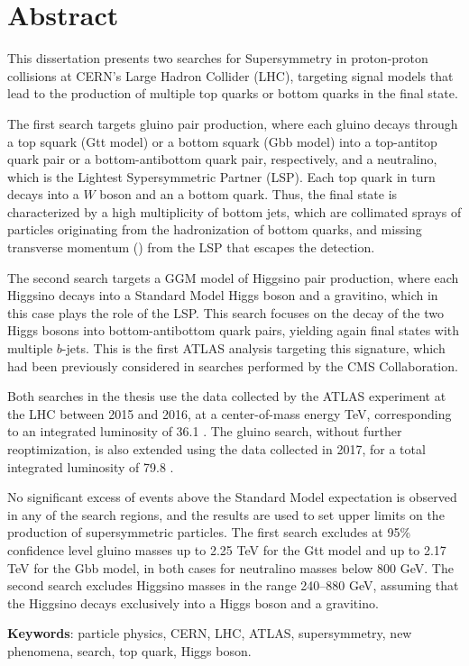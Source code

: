 \chapter*{Abstract}

This dissertation presents two searches for Supersymmetry in proton-proton collisions at CERN's Large Hadron Collider (LHC), 
targeting signal models that lead to the production of multiple top quarks or bottom quarks in the final state.

The first search targets gluino pair production, where each gluino decays through a top squark (Gtt model) or a bottom squark (Gbb model) 
into a top-antitop quark pair or a bottom-antibottom quark pair, respectively, and a neutralino, which is the Lightest Sypersymmetric Partner (LSP).
Each top quark in turn decays into a $W$ boson and an a bottom quark.
Thus, the final state is characterized by a high multiplicity of bottom jets, which are collimated sprays of particles originating from the hadronization of bottom quarks, and 
missing transverse momentum (\met) from the LSP that escapes the detection. 

The second search targets a GGM model of Higgsino pair production, 
where each Higgsino decays into a Standard Model Higgs boson and 
a gravitino, which in this case plays the role of the LSP. 
This search focuses on the decay of the two Higgs bosons into bottom-antibottom quark pairs, yielding again final states with multiple $b$-jets.
This is the first ATLAS analysis targeting this signature, which had been 
previously considered in searches performed by the CMS Collaboration.

Both searches in the thesis use the data collected by the ATLAS experiment at the LHC 
between 2015 and 2016, at a center-of-mass energy  \cmtre TeV,
corresponding to an integrated luminosity of 36.1 \ifb.
The gluino search, without further reoptimization, is also extended using the data collected in 2017, for a total integrated luminosity of 79.8 \ifb.

No significant excess of events above the Standard Model expectation is observed in any of the search regions, 
and the results are used to set upper limits on the production of supersymmetric particles. 
The first search excludes at 95\% confidence level gluino masses up to 2.25 TeV for the Gtt model 
and up to 2.17 TeV for the Gbb model, in both cases for neutralino masses below 800 GeV.
The second search excludes Higgsino masses in the range 240--880 GeV, assuming 
that the Higgsino decays exclusively into a Higgs boson and a gravitino. 

\par\bigskip
\par\bigskip 
\par\bigskip

\noindent \textbf{Keywords}: particle physics, CERN, LHC, ATLAS, supersymmetry, new phenomena, search, top quark, Higgs boson. 

